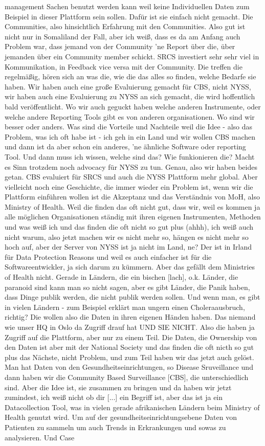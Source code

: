 management Sachen benutzt werden kann weil keine Individuellen Daten zum Beispiel in dieser Plattform sein sollen. Dafür ist sie einfach nicht gemacht. Die Communities, also hinsichtlich Erfahrung mit den Communities. Also gut ist nicht nur in Somaliland der Fall, aber ich weiß, dass es da am Anfang auch Problem war, dass jemand von der Community 'ne Report über die, über jemanden über ein Community member schickt. SRCS investiert sehr sehr viel in Kommunikation, in Feedback vice versa mit der Community. Die treffen die regelmäßig, hören sich an was die, wie die das alles so finden, welche Bedarfe sie haben. Wir haben auch eine große Evaluierung gemacht für CBS, nicht NYSS, wir haben auch eine Evaluierung zu NYSS an sich gemacht, die wird hoffentlich bald veröffentlicht. Wo wir auch geguckt haben welche anderen Instrumente, oder welche andere Reporting Tools gibt es von anderen organisationen. Wo sind wir besser oder anders. Was sind die Vorteile und Nachteile weil die Idee - also das Problem, was ich oft habe ist - ich geh in ein Land und wir wollen CBS machen und dann ist da aber schon ein anderes, 'ne ähnliche Software oder reporting Tool. Und dann muss ich wissen, welche sind das? Wie funkionieren die? Macht es Sinn trotzdem noch advocacy für NYSS zu tun. Genau, also wir haben beides getan. CBS evaluiert für SRCS und auch die NYSS Plattform mehr global. Aber vielleicht noch eine Geschichte, die immer wieder ein Problem ist, wenn wir die Plattform einführen wollen ist die Akzeptanz und das Verständnis von MoH, also Ministry of Health. Weil die finden das oft nicht gut, dass wir, weil es kommen ja alle möglichen Organisationen ständig mit ihren eigenen Instrumenten, Methoden und was weiß ich und das finden die oft nicht so gut plus (ahhh), ich weiß auch nicht warum, also jetzt machen wir es nicht mehr so, hängen es nicht mehr so hoch auf, aber der Server von NYSS ist ja nicht im Land, ne? Der ist in Irland für Data Protection Reasons und weil es auch einfacher ist für die Softwareentwickler, ja sich darum zu kümmern. Aber das gefällt dem Ministries of Health nicht. Gerade in Ländern, die ein bischen [lach], o.k. Länder, die paranoid sind kann man so nicht sagen, aber es gibt Länder, die Panik haben, dass Dinge publik werden, die nicht publik werden sollen. Und wenn man, es gibt in vielen Ländern - zum Beispiel erklärt man ungern einen Choleraausbruch, richtig? Die wollen also die Daten in ihren eigenen Händen haben. Das niemand wie unser HQ in Oslo da Zugriff drauf hat UND SIE NICHT. Also die haben ja Zugriff auf die Plattform, aber nur zu einem Teil. Die Daten, die Ownership von den Daten ist aber mit der National Society und das finden die oft nicth so gut plus das Nächste, nicht Problem, und zum Teil haben wir das jetzt auch gelöst. Man hat Daten von den Gesundheitseinrichtungen, so Disease Sruveillance und dann haben wir die Community Based Surveillance [CBS], die unterschiedlich sind. Aber die Idee ist, sie zusammen zu bringen und da haben wir jetzt zumindest, ich weiß nicht ob dir [...] ein Begriff ist, aber das ist ja ein Datacollection Tool, was in vielen gerade afrikanischen Ländern beim Ministry of Health genutzt wird. Um auf der gesundheitseinrichtungsebene Daten von Patienten zu sammeln um auch Trends in Erkrankungen und sowas  zu analysieren. Und Case 